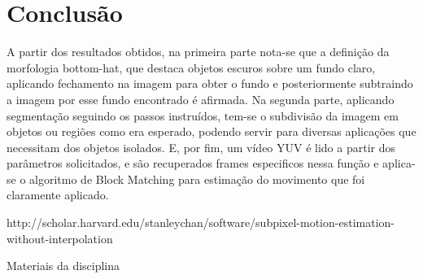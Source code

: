 \documentclass[journal]{IEEEtran}
\begin{document}
\begin{figure}[h]
\centering
{}
\end{figure}




\section{Conclusão}
A partir dos resultados obtidos, na primeira parte nota-se que a definição da morfologia bottom-hat, que destaca objetos escuros sobre um fundo claro, aplicando fechamento na imagem para obter o fundo e posteriormente subtraindo a imagem por esse fundo encontrado é afirmada. Na segunda parte, aplicando segmentação seguindo os passos instruídos, tem-se o subdivisão da imagem em objetos ou regiões como era esperado, podendo servir para diversas aplicações que necessitam dos objetos isolados. E, por fim, um vídeo YUV é lido a partir dos parâmetros solicitados, e são recuperados frames especificos nessa função e aplica-se o algoritmo de Block Matching para estimação do movimento que foi claramente aplicado.

\begin{thebibliography}{1}


http://scholar.harvard.edu/stanleychan/software/subpixel-motion-estimation-without-interpolation

Materiais da disciplina

\end{thebibliography}
\end{document}
